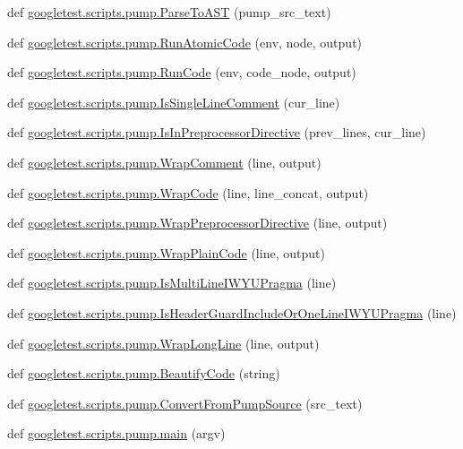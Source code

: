 \begin{DoxyCompactItemize}
\item 
def \mbox{\hyperlink{namespacegoogletest_1_1scripts_1_1pump_adc11d526c29ce7f4fe97fddaa5b7af6d}{googletest.\+scripts.\+pump.\+Parse\+To\+A\+ST}} (pump\+\_\+src\+\_\+text)
\item 
def \mbox{\hyperlink{namespacegoogletest_1_1scripts_1_1pump_a4dec014b290e434e2e1380cf3646d499}{googletest.\+scripts.\+pump.\+Run\+Atomic\+Code}} (env, node, output)
\item 
def \mbox{\hyperlink{namespacegoogletest_1_1scripts_1_1pump_a645cff5f4a7de53cc1dbe113376f9780}{googletest.\+scripts.\+pump.\+Run\+Code}} (env, code\+\_\+node, output)
\item 
def \mbox{\hyperlink{namespacegoogletest_1_1scripts_1_1pump_af515e40b64348bf921e5eaa6f2d551f4}{googletest.\+scripts.\+pump.\+Is\+Single\+Line\+Comment}} (cur\+\_\+line)
\item 
def \mbox{\hyperlink{namespacegoogletest_1_1scripts_1_1pump_ac61b8df31b383d3c0aa0b45449264358}{googletest.\+scripts.\+pump.\+Is\+In\+Preprocessor\+Directive}} (prev\+\_\+lines, cur\+\_\+line)
\item 
def \mbox{\hyperlink{namespacegoogletest_1_1scripts_1_1pump_a74946252fc72df527c45ecf228d5328f}{googletest.\+scripts.\+pump.\+Wrap\+Comment}} (line, output)
\item 
def \mbox{\hyperlink{namespacegoogletest_1_1scripts_1_1pump_a224bd856240f99990f0f9aaaf38302cd}{googletest.\+scripts.\+pump.\+Wrap\+Code}} (line, line\+\_\+concat, output)
\item 
def \mbox{\hyperlink{namespacegoogletest_1_1scripts_1_1pump_aa562b4b01cbc8bc0cbe6ae79b19d25a2}{googletest.\+scripts.\+pump.\+Wrap\+Preprocessor\+Directive}} (line, output)
\item 
def \mbox{\hyperlink{namespacegoogletest_1_1scripts_1_1pump_aa61f24be43b6f2cfd72b501f6cd6b86d}{googletest.\+scripts.\+pump.\+Wrap\+Plain\+Code}} (line, output)
\item 
def \mbox{\hyperlink{namespacegoogletest_1_1scripts_1_1pump_ad5e1d2f62ae9a910da552b5ae973b668}{googletest.\+scripts.\+pump.\+Is\+Multi\+Line\+I\+W\+Y\+U\+Pragma}} (line)
\item 
def \mbox{\hyperlink{namespacegoogletest_1_1scripts_1_1pump_a682135b6c619b01b1f3e5fdfab227950}{googletest.\+scripts.\+pump.\+Is\+Header\+Guard\+Include\+Or\+One\+Line\+I\+W\+Y\+U\+Pragma}} (line)
\item 
def \mbox{\hyperlink{namespacegoogletest_1_1scripts_1_1pump_a96489330d7e204b9272f265faa4788b9}{googletest.\+scripts.\+pump.\+Wrap\+Long\+Line}} (line, output)
\item 
def \mbox{\hyperlink{namespacegoogletest_1_1scripts_1_1pump_ad3452a9d016272f795c211b327349c9b}{googletest.\+scripts.\+pump.\+Beautify\+Code}} (string)
\item 
def \mbox{\hyperlink{namespacegoogletest_1_1scripts_1_1pump_a9c55945634866ab4e8c1143909005b73}{googletest.\+scripts.\+pump.\+Convert\+From\+Pump\+Source}} (src\+\_\+text)
\item 
def \mbox{\hyperlink{namespacegoogletest_1_1scripts_1_1pump_a05de322e2f9b2c7794247e613d8f6629}{googletest.\+scripts.\+pump.\+main}} (argv)
\end{DoxyCompactItemize}
